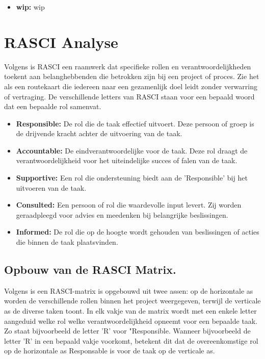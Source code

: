 \begin{itemize}
    \item \textbf{wip:} wip
    
\end{itemize}



\section{RASCI Analyse}

Volgens \textcite{Epam2024} is RASCI een raamwerk dat specifieke rollen en verantwoordelijkheden toekent aan belanghebbenden die betrokken zijn bij een project of proces. Zie het als een routekaart die iedereen naar een gezamenlijk doel leidt zonder verwarring of vertraging. 
De verschillende letters van RASCI staan voor een bepaald woord dat een bepaalde rol samenvat.

\begin{itemize}
    \item \textbf{Responsible:} De rol die de taak effectief uitvoert. Deze persoon of groep is de drijvende kracht achter de uitvoering van de taak. 
    \item \textbf{Accountable:} De eindverantwoordelijke voor de taak. Deze rol draagt de verantwoordelijkheid voor het uiteindelijke succes of falen van de taak. 
    \item \textbf{Supportive:} Een rol die ondersteuning biedt aan de 'Responsible' bij het uitvoeren van de taak. 
    \item \textbf{Consulted:} Een persoon of rol die waardevolle input levert. Zij worden geraadpleegd voor advies en meedenken bij belangrijke beslissingen.
    \item \textbf{Informed:} De rol die op de hoogte wordt gehouden van beslissingen of acties die binnen de taak plaatsvinden.
\end{itemize}

\subsection{Opbouw van de RASCI Matrix.}
Volgens \textcite{Cabanillas2011} is een RASCI-matrix is opgebouwd uit twee assen: op de horizontale as worden de verschillende rollen binnen het project weergegeven, terwijl de verticale as de diverse taken toont. In elk vakje van de matrix wordt met een enkele letter aangeduid welke rol welke verantwoordelijkheid opneemt voor een bepaalde taak. Zo staat bijvoorbeeld de letter 'R' voor "Responsible. Wanneer bijvoorbeeld de letter 'R' in een bepaald vakje voorkomt, betekent dit dat de overeenkomstige rol op de horizontale as Responsable is voor de taak op de verticale as. \autocite{Cabanillas2011}

